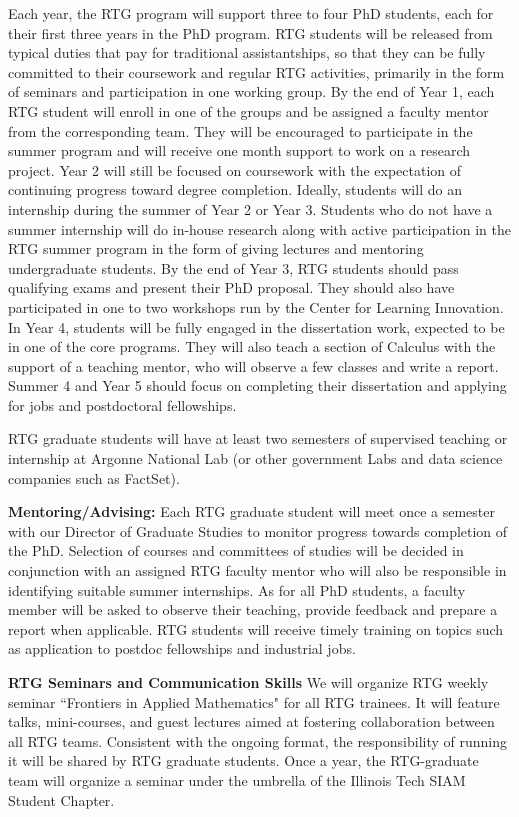 \documentclass[11pt]{article}
\begin{document}
Each year, the RTG program will support three to four PhD students, each for their first three years in the
PhD program. RTG students will be released from typical duties that pay for traditional assistantships, so
that they can be fully committed to their coursework and regular RTG activities, primarily in the form of
seminars and participation in one working group. By the end of Year 1, each RTG student will enroll in one
of the groups and be assigned a faculty mentor from the corresponding team. They will be encouraged to
participate in the summer program and will receive one month support to work on a research project. Year 2
will still be focused on coursework with the expectation of continuing progress toward degree completion.
Ideally, students will do an internship during the summer of Year 2 or Year 3. Students who do not have
a summer internship will do in-house research along with active participation in the RTG summer program
in the form of giving lectures and mentoring undergraduate students. By the end of Year 3, RTG students
should pass qualifying exams and present their PhD proposal. They should also have participated in one to
two workshops run by the Center for Learning Innovation. In Year 4, students will be fully engaged in the dissertation work, expected
to be in one of the core programs. They will also teach a section of Calculus with the support of a teaching
mentor, who will observe a few classes and write a report. Summer 4 and Year 5 should focus on completing
their dissertation and applying for jobs and postdoctoral fellowships.

RTG graduate students will have at least two semesters of supervised teaching or internship at Argonne National Lab (or other government Labs and data science companies such as FactSet). 

 

\textbf{Mentoring/Advising:} Each RTG graduate student will meet once a semester with our Director of Graduate
Studies to monitor progress towards completion of the PhD. Selection of courses and committees of studies
will be decided in conjunction with an assigned RTG faculty mentor who will also be responsible in identifying
suitable summer internships.   As for all PhD students, a faculty member will be asked to observe their
teaching, provide feedback and prepare a report when applicable. RTG students will receive timely training
on topics such as application to postdoc fellowships and industrial jobs.
 

\textbf{RTG Seminars and Communication Skills}
We will organize RTG  weekly   seminar ``Frontiers in Applied Mathematics" for all RTG trainees. It
will feature talks, mini-courses, and guest lectures aimed at fostering collaboration between all RTG teams.
Consistent with the ongoing format, the responsibility of running it will be shared by RTG graduate students.
Once a year, the RTG-graduate team will organize a seminar under the umbrella of the Illinois Tech SIAM Student Chapter.  
\end{document}
